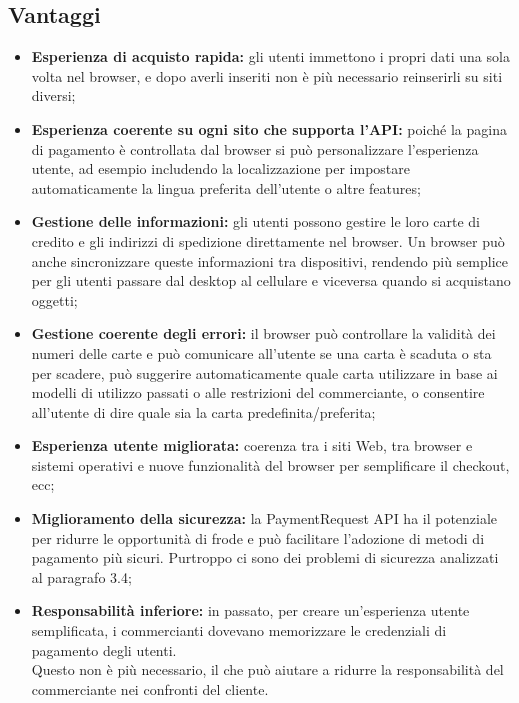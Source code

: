 \documentclass[11pt ,a4paper , twoside , openright ]{book}
\begin{document}
	\subsection[Vantaggi]{Vantaggi \cite{rif13}}
	\begin{itemize}
		\item \textbf{Esperienza di acquisto rapida:} gli utenti immettono i propri dati una sola volta nel browser, e dopo averli inseriti non è più necessario reinserirli su siti diversi;
		\item \textbf{Esperienza coerente su ogni sito che supporta l'API:} poiché la pagina di pagamento è controllata dal browser si può personalizzare l'esperienza utente, ad esempio includendo la localizzazione per impostare automaticamente la lingua preferita dell'utente o altre features;
		\item \textbf{Gestione delle informazioni:} gli utenti possono gestire le loro carte di credito e gli indirizzi di spedizione direttamente nel browser. Un browser può anche sincronizzare queste informazioni tra dispositivi, rendendo più semplice per gli utenti passare dal desktop al cellulare e viceversa quando si acquistano oggetti;
		\item \textbf{Gestione coerente degli errori:} il browser può controllare la validità dei numeri delle carte e può comunicare all'utente se una carta è scaduta o sta per scadere, può suggerire automaticamente quale carta utilizzare in base ai modelli di utilizzo passati o alle restrizioni del commerciante, o consentire all'utente di dire quale sia la carta predefinita/preferita;
		\item \textbf{Esperienza utente migliorata:} coerenza tra i siti Web, tra browser e sistemi operativi e nuove funzionalità del browser per semplificare il checkout, ecc;
		\item \textbf{Miglioramento della sicurezza:} la PaymentRequest API ha il potenziale per ridurre le opportunità di frode e può facilitare l'adozione di metodi di pagamento più sicuri. Purtroppo ci sono dei problemi di sicurezza analizzati al paragrafo 3.4; 
		\item \textbf{Responsabilità inferiore:} in passato, per creare un'esperienza utente semplificata, i commercianti dovevano memorizzare le credenziali di pagamento degli utenti. \\Questo non è più necessario, il che può aiutare a ridurre la responsabilità del commerciante nei confronti del cliente.
	\end{itemize}
	
\end{document}
